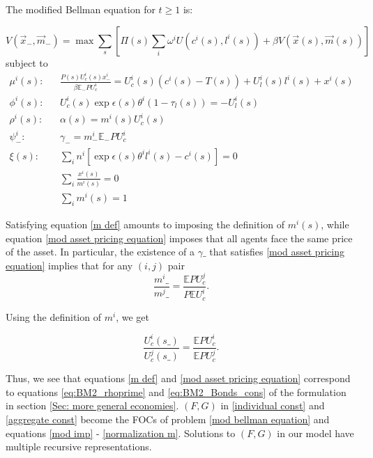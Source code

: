 \documentclass[thmsb,11pt]{article}
\newcommand{\EE}{\mathbb E}
\begin{document}
\noindent The modified Bellman equation for $t\geq 1$ is:



\begin{equation}\label{mod bellman equation}
	V(\vec{x}_-,\vec{m}_{-}) = \max \sum_{s}\left[ \Pi(s) \sum_i \omega^iU(c^i(s),l^i(s)) + \beta V(\vec{x}(s),\vec{m}(s))\right]
\end{equation}
subject to
\begin{align}
\mu^i(s):&&	\frac{P(s)U^i_c(s) x^i_{-} }{\beta\EE_- PU^i_c} = U^i_c(s)(c^i(s)-T(s)) + U^i_l(s) l^i(s) + x^i(s)\\\label{mod imp}
\phi^i(s):&&	U^i_c(s)\exp{\epsilon(s)}\theta^i(1-\tau_l(s)) = -U^i_l(s)\\
\rho^i(s):&&	\alpha(s) = m^i(s) U^i_c(s)\\ \label{m def}
\psi^i_{-}:&&	\gamma_-=  m^i_-\EE_- P U^i_c\\ \label{mod asset pricing equation}
\xi(s):&&	\sum_in^i\left[\exp{\epsilon(s)}\theta^il^i(s) - c^i(s)\right] =0\\
	&&\sum_i \frac{x^i(s)}{m^i(s)} = 0\\
	&&\sum_i m^i(s) = 1 \label{normalization m}
\end{align}


Satisfying equation \eqref{m def}  amounts to imposing the definition of $m^i(s)$,  while equation \eqref{mod asset pricing equation} imposes that all agents face the same  price of the asset. In particular, the existence of a $\gamma\_$ that satisfies \eqref{mod asset pricing equation} implies that for any $(i,j)$ pair
\[\frac{m^i\_}{m^j\_}=\frac{\mathbb{E}P U_c^j}{P \mathbb{E} U^i_c}.\]

\noindent Using the definition of $m^i$, we get

\[\frac{U^i_c(s\_)}{U^j_c(s\_)}=\frac{\mathbb{E}P U_c^i}{\mathbb{E}P U_c^j}.\]

\noindent Thus, we see that  equations \eqref{m def} and \eqref{mod asset pricing equation} correspond to equations \eqref{eq:BM2_rhoprime} and \eqref{eq:BM2_Bonds_cons} of the formulation in section \ref{Sec: more general economies}.
$\left(F,G\right)$  in \eqref{individual const} and \eqref{aggregate const} become the FOCs of problem \eqref{mod bellman equation} and equations \eqref{mod imp} - \eqref{normalization m}. Solutions to $\left(F,G\right)$ in our model have multiple recursive representations.
\end{document}
